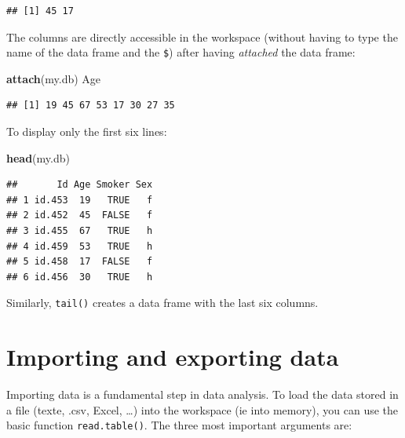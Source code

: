 \documentclass[]{book}
\newenvironment{Shaded}{\begin{snugshade}}{\end{snugshade}}
\newcommand{\CommentTok}[1]{\textcolor[rgb]{0.56,0.35,0.01}{\textit{#1}}}
\newcommand{\KeywordTok}[1]{\textcolor[rgb]{0.13,0.29,0.53}{\textbf{#1}}}
\newcommand{\NormalTok}[1]{#1}
\newcommand{\OperatorTok}[1]{\textcolor[rgb]{0.81,0.36,0.00}{\textbf{#1}}}
\newcommand{\OtherTok}[1]{\textcolor[rgb]{0.56,0.35,0.01}{#1}}
\newcommand{\StringTok}[1]{\textcolor[rgb]{0.31,0.60,0.02}{#1}}
\begin{document}
\begin{Shaded}
\end{Shaded}

\begin{verbatim}
## [1] 45 17
\end{verbatim}

The columns are directly accessible in the workspace (without having to type the name of the data frame and the \texttt{\$}) after having \emph{attached} the data frame:

\begin{Shaded}
\begin{Highlighting}[]
\KeywordTok{attach}\NormalTok{(my.db)}
\NormalTok{Age}
\end{Highlighting}
\end{Shaded}

\begin{verbatim}
## [1] 19 45 67 53 17 30 27 35
\end{verbatim}

To display only the first six lines:

\begin{Shaded}
\begin{Highlighting}[]
\KeywordTok{head}\NormalTok{(my.db)}
\end{Highlighting}
\end{Shaded}

\begin{verbatim}
##       Id Age Smoker Sex
## 1 id.453  19   TRUE   f
## 2 id.452  45  FALSE   f
## 3 id.455  67   TRUE   h
## 4 id.459  53   TRUE   h
## 5 id.458  17  FALSE   f
## 6 id.456  30   TRUE   h
\end{verbatim}

Similarly, \texttt{tail()} creates a data frame with the last six columns.

\hypertarget{importing-and-exporting-data}{%
\section{Importing and exporting data}\label{importing-and-exporting-data}}

Importing data is a fundamental step in data analysis. To load the data stored in a file (texte, .csv, Excel, \ldots{}) into the workspace (ie into memory), you can use the basic function \texttt{read.table()}. The three most important arguments are:
\end{document}
